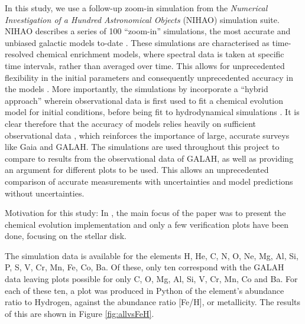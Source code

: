 \documentclass[fleqn,usenatbib]{mnras}
\begin{document}
In this study, we use a follow-up zoom-in simulation from the \textit{Numerical Investigation of a Hundred Astronomical Objects} (NIHAO) simulation suite. NIHAO describes a series of 100 “zoom-in” simulations, the most accurate and unbiased galactic models to-date \citep{Wang2015}. These simulations are characterised as time-resolved chemical enrichment models, where spectral data is taken at specific time intervals, rather than averaged over time. This allows for unprecedented flexibility in the initial parameters and consequently unprecedented accuracy in the models \citep{Buck2021}. 
More importantly, the simulations by \citet{Buck2021} incorporate a “hybrid approach” wherein observational data is first used to fit a chemical evolution model for initial conditions, before being fit to hydrodynamical simulations \citep{Buck2021}. It is clear therefore that the accuracy of models relies heavily on sufficient observational data \citep{Wang2015}, which reinforces the importance of large, accurate surveys like Gaia and GALAH. The simulations are used throughout this project to compare to results from the observational data of GALAH, as well as providing an argument for different plots to be used. This allows an unprecedented comparison of accurate measurements with uncertainties and model predictions without uncertainties.

Motivation for this study: In \citet{Buck2021}, the main focus of the paper was to present the chemical evolution implementation and only a few verification plots have been done, focusing on the stellar disk.

The simulation data is available for the elements H, He, C, N, O, Ne, Mg, Al, Si, P, S, V, Cr, Mn, Fe, Co, Ba. Of these, only ten correspond with the GALAH data leaving plots possible for only C, O, Mg, Al, Si, V, Cr, Mn, Co and Ba. For each of these ten, a plot was produced in Python of the element's abundance ratio to Hydrogen, against the abundance ratio [Fe/H], or metallicity. The results of this are shown in Figure \ref{fig:allvsFeH}. 
\end{document}
